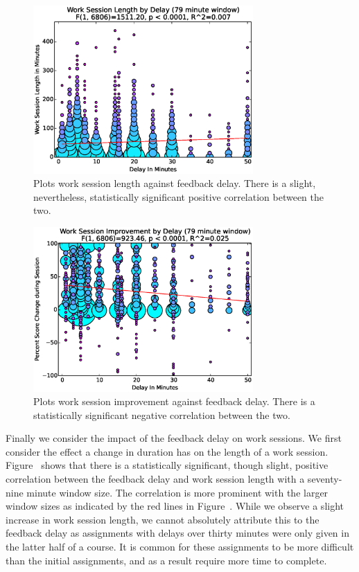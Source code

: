 \begin{figure}[!t]
\centering
\includegraphics[width=3.3in]{graphs/Work_Session_Length_by_Delay_(79_minute_window).eps}
\caption{Plots work session length against feedback delay. There is a slight,
  nevertheless, statistically significant positive correlation between the
  two.}
\end{figure}

\begin{figure}[!t]
\centering
\includegraphics[width=3.3in]{graphs/Work_Session_Improvement_by_Delay_(79_minute_window).eps}
\caption{Plots work session improvement against feedback delay. There is a
  statistically significant negative correlation between the two.}
\end{figure}

Finally we consider the impact of the feedback delay on work sessions. We first
consider the effect a change in duration has on the length of a work
session. Figure~ shows that there is a
statistically significant, though slight, positive correlation between the
feedback delay and work session length with a seventy-nine minute window
size. The correlation is more prominent with the larger window sizes as
indicated by the red lines in Figure~. While we
observe a slight increase in work session length, we cannot absolutely
attribute this to the feedback delay as assignments with delays over thirty
minutes were only given in the latter half of a course. It is common for these
assignments to be more difficult than the initial assignments, and as a result
require more time to complete.

